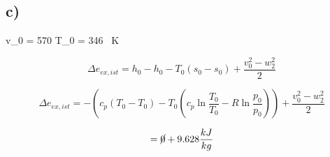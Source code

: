 

\subsection*{c)}
 v_0 = 570  \quad T_0 = 346 \, K

\[
\Delta e_{ex, ist} = h_0 - h_0 - T_0 (s_0 - s_0) + \frac{v_0^2 - w_2^2}{2}
\]

\[
\Delta e_{ex, ist} = - (c_p (T_0 - T_0) - T_0 (c_p \ln \frac{T_0}{T_0} - R \ln \frac{p_0}{p_0})) + \frac{v_0^2 - w_2^2}{2}
\]

\[
= \cancel{0} + 9.628 \frac{kJ}{kg}
\]